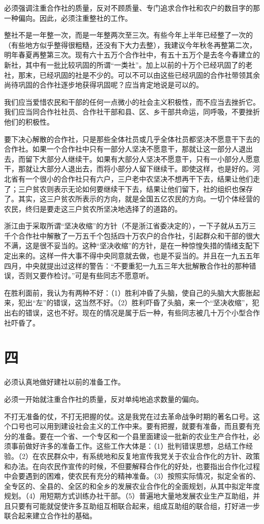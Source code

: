 必须强调注重合作社的质量，反对不顾质量、专门追求合作社和农户的数目字的那一种偏向。因此，必须注重整社的工作。

整社不是一年整一次，而是一年整两次至三次。有些今年上半年已经整了一次的（有些地方似乎整得很粗糙，还没有下大力去整），我建议今年秋冬再整第二次，明年春夏再整第三次。现有六十五万个合作社中，有五十五万个是去冬今春建立的新社，其中有一批比较巩固的所谓“一类社”。加上以前的十万个已经巩固了的老社，那末，已经巩固的社是不少的。可以不可以由这些已经巩固的合作社带领其余尚待巩固的合作社逐步地获得巩固呢？应当肯定地说是可以的。

我们应当爱惜农民和干部的任何一点微小的社会主义积极性，而不应当去挫折它。我们应当同合作社社员、合作社干部和县、区、乡干部共命运，同呼吸，不要挫折他们的积极性。

要下决心解散的合作社，只是那些全体社员或几乎全体社员都坚决不愿意干下去的合作社。如果一个合作社中只有一部分人坚决不愿意干，那就让这一部分人退出去，而留下大部分人继续干。如果有大部分人坚决不愿意干，只有一小部分人愿意干，那就让大部分人退出去，而将小部分人留下继续干。即使这样，也是好的。河北省有一个很小的合作社只有六户，三户老中农坚决不想再干下去，结果让他们走了；三户贫农则表示无论如何要继续干下去，结果让他们留下，社的组织也保存了。其实，这三户贫农所表示的方向，就是全国五亿农民的方向。一切个体经营的农民，终归是要走这三户贫农所坚决地选择了的道路的。

浙江由于采取所谓“坚决收缩”的方针（不是浙江省委决定的），一下子就从五万三千个合作社中解散了一万五千个包括四十万农户的合作社，引起群众和干部的很大不满，这是很不妥当的。这种“坚决收缩”的方针，是在一种惊惶失措的情绪支配下定出来的。这样一件大事不得中央同意就去做，也是不妥当的。并且在一九五五年四月，中央就提出过这样的警告：“不要重犯一九五三年大批解散合作社的那种错误，否则又要作检讨。”可是有些同志不愿意听。

在胜利面前，我认为有两种不好：（1）胜利冲昏了头脑，使自己的头脑大大膨胀起来，犯出“左”的错误，这当然不好。（2）胜利吓昏了头脑，来一个“坚决收缩”，犯出右的错误，这也不好。现在的情况是属于后一种，有些同志被几十万个小型合作社吓昏了。

\section*{四}

必须认真地做好建社以前的准备工作。

必须一开始就注重合作社的质量，反对单纯地追求数量的偏向。

不打无准备的仗，不打无把握的仗。这是我党在过去革命战争时期的著名口号。这个口号也可以用到建设社会主义的工作中来。要有把握，就要有准备，而且要有充分的准备。要在一个省、一个专区和一个县里面建设一批新的农业生产合作社，必须事前做好许多的准备工作。这些工作大体是：（1）批判错误思想，总结工作经验。（2）在农民群众中，有系统地和反复地宣传我党关于农业合作化的方针、政策和办法。在向农民作宣传的时候，不但要解释合作化的好处，也要指出合作化过程中会要遇到的困难，使农民有充分的精神准备。（3）按照实际情况，拟定全省的、全专区的、全县的、全区的和全乡的发展农业合作化的全面规划，从其中拟定年度规划。（4）用短期方式训练办社干部。（5）普遍地大量地发展农业生产互助组，并且只要有可能就促使许多互助组互相联合起来，组成互助组的联合组，打好进一步联合起来建立合作社的基础。

